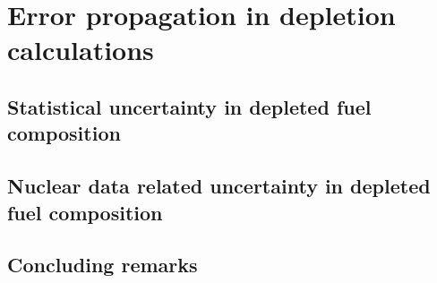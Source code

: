 \chapter{Error propagation in depletion calculations}

\section{Statistical uncertainty in depleted fuel composition}

\section{Nuclear data related uncertainty in depleted fuel composition}

\section{Concluding remarks}